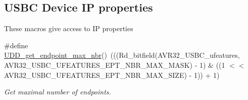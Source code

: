 \subsection*{\-U\-S\-B\-C \-Device \-I\-P properties}
\label{_amgrp55d0406ba5e21eb26b437407f55e3f47}%
 \-These macros give access to \-I\-P properties \begin{DoxyCompactItemize}
\item 
\#define \hyperlink{group__udd__group_ga4f3fc518ef0e369cc01a7bf7c6516844}{\-U\-D\-D\-\_\-get\-\_\-endpoint\-\_\-max\-\_\-nbr}()~(((\-Rd\-\_\-bitfield(\-A\-V\-R32\-\_\-\-U\-S\-B\-C\-\_\-ufeatures, \-A\-V\-R32\-\_\-\-U\-S\-B\-C\-\_\-\-U\-F\-E\-A\-T\-U\-R\-E\-S\-\_\-\-E\-P\-T\-\_\-\-N\-B\-R\-\_\-\-M\-A\-X\-\_\-\-M\-A\-S\-K) -\/ 1) \& ((1 $<$$<$ \-A\-V\-R32\-\_\-\-U\-S\-B\-C\-\_\-\-U\-F\-E\-A\-T\-U\-R\-E\-S\-\_\-\-E\-P\-T\-\_\-\-N\-B\-R\-\_\-\-M\-A\-X\-\_\-\-S\-I\-Z\-E) -\/ 1)) + 1)
\begin{DoxyCompactList}\small\item\em \-Get maximal number of endpoints. \end{DoxyCompactList}\end{DoxyCompactItemize}
